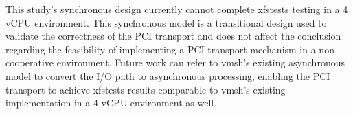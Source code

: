 \begin{ZhChapter}
This study's synchronous design currently cannot complete xfstests testing in a 4 vCPU environment. This synchronous model is a transitional design used to validate the correctness of the PCI transport and does not affect the conclusion regarding the feasibility of implementing a PCI transport mechanism in a non-cooperative environment. Future work can refer to vmsh's existing asynchronous model to convert the I/O path to asynchronous processing, enabling the PCI transport to achieve xfstests results comparable to vmsh's existing implementation in a 4 vCPU environment as well.

\end{ZhChapter}
